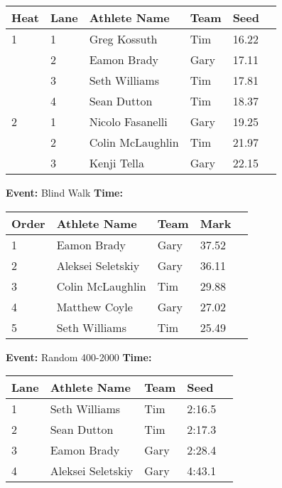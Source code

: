 \documentclass[10pt]{article}
\begin{document}
\vspace{1em}
\begin{tabular}{@{}llllll@{}}
\toprule
\textbf{{Heat}} &
\textbf{Lane} & \textbf{Athlete Name} & \textbf{Team} & \textbf{Seed} \\
\midrule
1 & 1 & Greg Kossuth & Tim & 16.22 &\\
 & 2 & Eamon Brady & Gary & 17.11 &\\
 & 3 & Seth Williams & Tim & 17.81 &\\
 & 4 & Sean Dutton & Tim & 18.37 &\\
2 & 1 & Nicolo Fasanelli & Gary & 19.25 &\\
 & 2 & Colin McLaughlin & Tim & 21.97 &\\
 & 3 & Kenji Tella & Gary & 22.15 &\\
\bottomrule
\end{tabular}
\vspace{2.5em}


\textbf{Event:} Blind Walk \quad \textbf{Time:}  

\vspace{1em}
\begin{tabular}{@{}lllll@{}}
\toprule

\textbf{Order} & \textbf{Athlete Name} & \textbf{Team} & \textbf{Mark} \\
\midrule
1 & Eamon Brady & Gary & 37.52 &\\
2 & Aleksei Seletskiy & Gary & 36.11 &\\
3 & Colin McLaughlin & Tim & 29.88 &\\
4 & Matthew Coyle & Gary & 27.02 &\\
5 & Seth Williams & Tim & 25.49 &\\
\bottomrule
\end{tabular}
\vspace{2.5em}


\textbf{Event:} Random 400-2000 \quad \textbf{Time:}  

\vspace{1em}
\begin{tabular}{@{}lllll@{}}
\toprule

\textbf{Lane} & \textbf{Athlete Name} & \textbf{Team} & \textbf{Seed} \\
\midrule
1 & Seth Williams & Tim & 2:16.5 &\\
2 & Sean Dutton & Tim & 2:17.3 &\\
3 & Eamon Brady & Gary & 2:28.4 &\\
4 & Aleksei Seletskiy & Gary & 4:43.1 &\\
\bottomrule
\end{tabular}
\vspace{2.5em}
\end{document}
